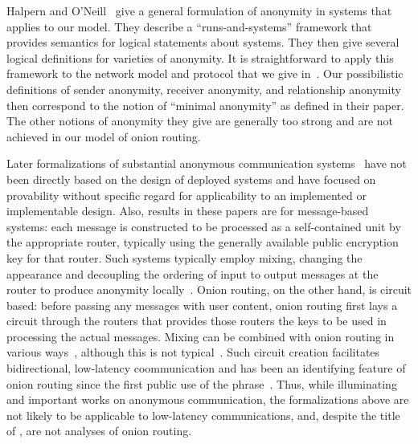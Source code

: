\documentclass[prodmode,acmtissec]{acmsmall}
\begin{document}
Halpern and O'Neill~ give a general formulation of anonymity in systems that applies to our model.  They describe a ``runs-and-systems'' framework that provides semantics for logical statements about systems.  They then give several logical definitions for varieties of anonymity.  It is straightforward to	apply this framework to the network model and protocol that we give in~\cite{FC07}.  Our possibilistic definitions of sender anonymity, receiver anonymity, and relationship anonymity then correspond to the notion of ``minimal anonymity'' as defined in their paper.  The other notions of anonymity they give are generally too strong and are not achieved in our model of onion routing.

Later formalizations of substantial anonymous communication
systems~\cite{camlys05,MAUW,Wikstrom04} have not been directly based on the
design of deployed systems and have focused on provability without
specific regard for applicability to an implemented or implementable
design. Also, results in these papers are for message-based
systems: each message is constructed to be processed as a
self-contained unit by the appropriate router, typically using the
generally available public encryption key for that router. Such
systems typically employ mixing, changing the appearance and
decoupling the ordering of input to output messages at the router to
produce anonymity locally~\cite{chaum-mix}.  Onion routing, on the
other hand, is circuit based: before passing any messages with user
content, onion routing first lays a circuit through the routers that
provides those routers the keys to be used in processing the actual
messages. Mixing can be combined with onion routing in various
ways~\cite{onion-routing:jsac98}, although this is not
typical~\cite{tor-design}. Such circuit creation facilitates
bidirectional, low-latency coommunication and has been an identifying
feature of onion routing since the first public use of the
phrase~\cite{onion-routing:ih96}. Thus, while illuminating and
important works on anonymous communication, the formalizations
above are not likely to be applicable to low-latency communications, and,
despite the title of \cite{camlys05}, are not analyses of onion
routing.
\end{document}
